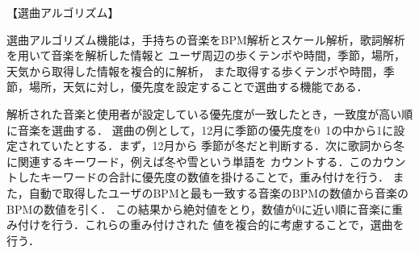 【選曲アルゴリズム】
\par
選曲アルゴリズム機能は，手持ちの音楽をBPM解析とスケール解析，歌詞解析を用いて音楽を解析した情報と
ユーザ周辺の歩くテンポや時間，季節，場所，天気から取得した情報を複合的に解析，
また取得する歩くテンポや時間，季節，場所，天気に対し，優先度を設定することで選曲する機能である．

\par
解析された音楽と使用者が設定している優先度が一致したとき，一致度が高い順に音楽を選曲する．
選曲の例として，12月に季節の優先度を0~1の中から1に設定されていたとする．まず，12月から
季節が冬だと判断する．次に歌詞から冬に関連するキーワード，例えば冬や雪という単語を
カウントする．このカウントしたキーワードの合計に優先度の数値を掛けることで，重み付けを行う．
また，自動で取得したユーザのBPMと最も一致する音楽のBPMの数値から音楽のBPMの数値を引く．
この結果から絶対値をとり，数値が0に近い順に音楽に重み付けを行う．これらの重み付けされた
値を複合的に考慮することで，選曲を行う．

